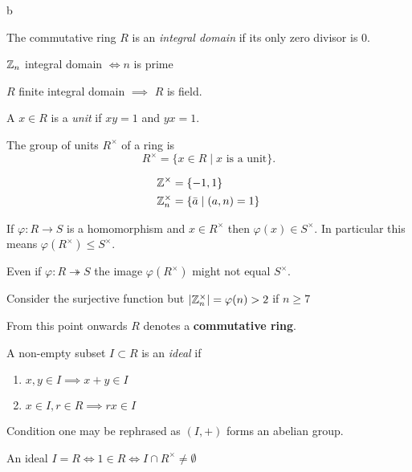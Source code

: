 b\documentclass[master.tex]{subfiles}
\begin{document}
\begin{defn*}
  The commutative ring \(R\) is an \emph{integral domain} if its only zero divisor is \(0\).
\end{defn*}

\begin{example*}
  \({\mathbb Z}_n\) integral domain \(\iff n\) is prime
\end{example*}

\begin{prop*}
  \(R\) finite integral domain \(\implies\) \(R\) is field.
\end{prop*}

\begin{defn*}
  A \(x \in R\) is a \emph{unit} if \(xy=1\) and \(yx=1\).
\end{defn*}

\begin{defn*}
  The group of units \(R^\times\) of a ring is
  \[R^\times = \{x \in R \mid x\text{ is a unit}\}.\]
\end{defn*}

\begin{example*}
  \begin{align*}
    {\mathbb Z}^\times &= \{-1,1\}\\
    {\mathbb Z}_n^\times &= \{\bar{a} \mid (a,n)=1\}
  \end{align*}
\end{example*}

\begin{prop*}
  If \(\varphi \colon R \to S\) is a homomorphism and \(x \in R^{\times}\) then \(\varphi(x) \in S^\times\). In
  particular this means \(\varphi(R^\times) \le S^\times\).
\end{prop*}

Even if \(\varphi \colon R \twoheadrightarrow S\) the image \(\varphi(R^\times)\) might not equal \(S^\times\).

\begin{example*}
  Consider the surjective function  but \(|{\mathbb Z}_n^\times|=\varphi(n)>2\) if
  \(n \ge 7\)
\end{example*}

\begin{notation}
  From this point onwards \(R\) denotes a \textbf{commutative ring}.
\end{notation}

\begin{defn*}
  A non-empty subset \(I \subset R\) is an \emph{ideal} if
  \begin{enumerate}[label=(\roman*)]
  \item \(x,y \in I \implies x+y \in I \)
  \item \(x \in I, r \in R \implies rx \in I\)
  \end{enumerate}
\end{defn*}
Condition one may be rephrased as \((I,+)\) forms an abelian group.
\begin{prop*}
  An ideal \(I=R \iff 1 \in R \iff I \cap R^\times \neq \emptyset\)
\end{prop*}
\end{document}
